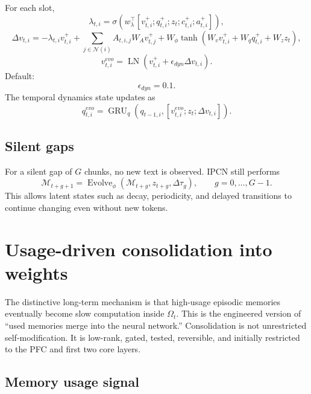 \documentclass[11pt]{article}
\newcommand{\LN}{\operatorname{LN}}
\newcommand{\Evolve}{\operatorname{Evolve}}
\newcommand{\Mem}{\mathcal{M}}
\begin{document}
For each slot,
\begin{equation}
    \lambda_{t,i}=\sigma(w_\lambda^\top[v_{t,i}^{+};q_{t,i}^{+};z_t;c_{t,i}^{+};a_{t,i}^{+}]),
\end{equation}
\begin{equation}
    \Delta v_{t,i}= -\lambda_{t,i}v_{t,i}^{+}+\sum_{j\in\mathcal{N}(i)}A_{t,i,j}W_Av_{t,j}^{+}+W_\phi\tanh(W_vv_{t,i}^{+}+W_q q_{t,i}^{+}+W_zz_t),
\end{equation}
\begin{equation}
    v_{t,i}^{evo}=\LN(v_{t,i}^{+}+\epsilon_{dyn}\Delta v_{t,i}).
\end{equation}
Default:
\begin{equation}
    \epsilon_{dyn}=0.1.
\end{equation}
The temporal dynamics state updates as
\begin{equation}
    q_{t,i}^{evo}=\operatorname{GRU}_q(q_{t-1,i},[v_{t,i}^{evo};z_t;\Delta v_{t,i}]).
\end{equation}

\subsection{Silent gaps}

For a silent gap of \(G\) chunks, no new text is observed. IPCN still performs
\begin{equation}
    \Mem_{t+g+1}=\Evolve_\phi(\Mem_{t+g},z_{t+g},\Delta \tau_g),\qquad g=0,\ldots,G-1.
\end{equation}
This allows latent states such as decay, periodicity, and delayed transitions to continue changing even without new tokens.

\section{Usage-driven consolidation into weights}

The distinctive long-term mechanism is that high-usage episodic memories eventually become slow computation inside \(\Omega_t\). This is the engineered version of ``used memories merge into the neural network.'' Consolidation is not unrestricted self-modification. It is low-rank, gated, tested, reversible, and initially restricted to the PFC and first two core layers.

\subsection{Memory usage signal}
\end{document}
